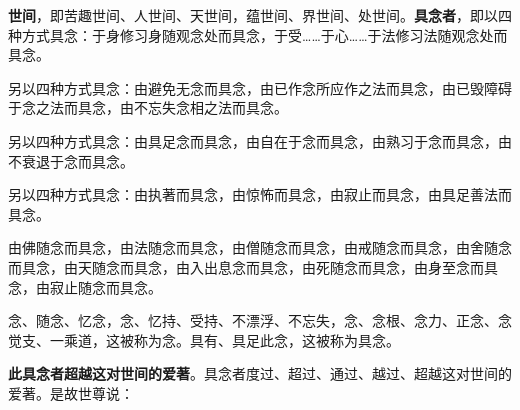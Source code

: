 \textbf{世间}，即苦趣世间、人世间、天世间，蕴世间、界世间、处世间。\textbf{具念者}，即以四种方式具念：于身修习身随观念处而具念，于受……于心……于法修习法随观念处而具念。


另以四种方式具念：由避免无念而具念，由已作念所应作之法而具念，由已毁障碍于念之法而具念，由不忘失念相之法而具念。


另以四种方式具念：由具足念而具念，由自在于念而具念，由熟习于念而具念，由不衰退于念而具念。


另以四种方式具念：由执著而具念，由惊怖而具念，由寂止而具念，由具足善法而具念。


由佛随念而具念，由法随念而具念，由僧随念而具念，由戒随念而具念，由舍随念而具念，由天随念而具念，由入出息念而具念，由死随念而具念，由身至念而具念，由寂止随念而具念。


念、随念、忆念，念、忆持、受持、不漂浮、不忘失，念、念根、念力、正念、念觉支、一乘道，这被称为念。具有、具足此念，这被称为具念。


\textbf{此具念者超越这对世间的爱著}。具念者度过、超过、通过、越过、超越这对世间的爱著。是故世尊说：



